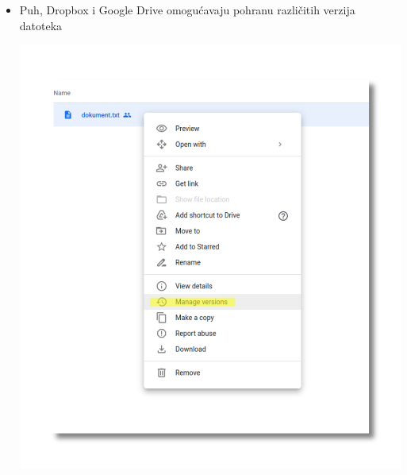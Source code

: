 \documentclass[aspectratio=169]{beamer}
\begin{document}
\begin{frame}
    \begin{itemize}
        \item Puh, Dropbox i Google Drive omogućavaju pohranu različitih verzija
            datoteka
            
        \vspace{1em}
            
        \begin{center}
            \includegraphics[scale=.28]{images/drive-vcs.png}
        \end{center}
    \end{itemize}
\end{frame}
\end{document}
